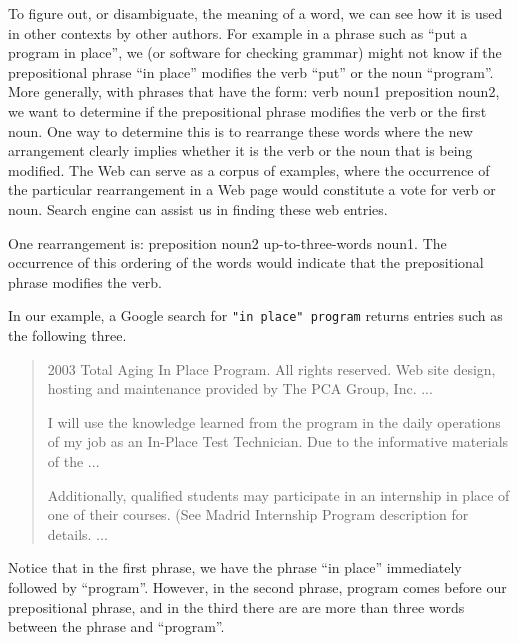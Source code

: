 To figure out, or disambiguate, the meaning of a word, we can see how
it is used in other contexts by other authors.  For example in a
phrase such as ``put a program in place'', we (or software for
checking grammar) might not know if the prepositional phrase ``in
place'' modifies the verb ``put'' or the noun ``program''.  More
generally, with phrases that have the form: verb noun1 preposition
noun2, we want to determine if the prepositional phrase modifies the
verb or the first noun.  One way to determine this is to rearrange
these words where the new arrangement clearly implies whether it is
the verb or the noun that is being modified.  The Web can serve as a
corpus of examples, where the occurrence of the particular
rearrangement in a Web page would constitute a vote for verb or noun.
Search engine can assist us in finding these web entries.

One rearrangement is: preposition noun2 up-to-three-words noun1.  The
occurrence of this ordering of the words would indicate that the
prepositional phrase modifies the verb.

In our example, a Google search for \verb+"in place" program+
returns entries such as the following three.
\begin{quote}
  2003 Total Aging In Place Program. All rights reserved. Web site
  design, hosting and maintenance provided by The PCA Group, Inc. ...

I will use the knowledge learned from the program in the daily
operations of my job as an In-Place Test Technician. Due to the
informative materials of the ...

Additionally, qualified students may participate in an internship in
place of one of their courses. (See Madrid Internship Program
description for details. ...
\end{quote}

Notice that in the first phrase, we have the phrase ``in place''
immediately followed by ``program''.  However, in the second phrase,
program comes before our prepositional phrase, and in the third there
are are more than three words between the phrase and ``program''.
 
